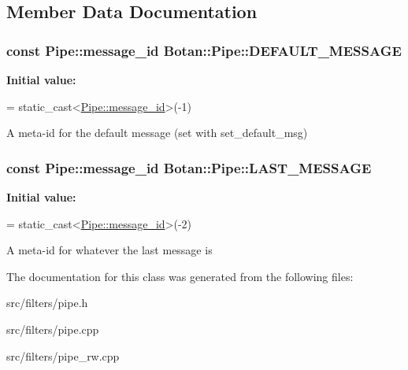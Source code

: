 \subsection{Member Data Documentation}
\hypertarget{classBotan_1_1Pipe_a75278149a3ca86f19db144049cfa2ed3}{
\subsubsection[{D\-E\-F\-A\-U\-L\-T\-\_\-\-M\-E\-S\-S\-A\-G\-E}]{\setlength{\rightskip}{0pt plus 5cm}const {\bf Pipe\-::message\-\_\-id} Botan\-::\-Pipe\-::\-D\-E\-F\-A\-U\-L\-T\-\_\-\-M\-E\-S\-S\-A\-G\-E\hspace{0.3cm}{\ttfamily [static]}}}\label{classBotan_1_1Pipe_a75278149a3ca86f19db144049cfa2ed3}
{\bfseries Initial value\-:}
\begin{DoxyCode}
=
   \textcolor{keyword}{static\_cast<}\hyperlink{classBotan_1_1Pipe_a122c19120c1c21f270b6b6225ca9883c}{Pipe::message\_id}\textcolor{keyword}{>}(-1)
\end{DoxyCode}
A meta-\/id for the default message (set with set\-\_\-default\-\_\-msg) \hypertarget{classBotan_1_1Pipe_a192a6452778feca6c4363a24b5612f46}{
\subsubsection[{L\-A\-S\-T\-\_\-\-M\-E\-S\-S\-A\-G\-E}]{\setlength{\rightskip}{0pt plus 5cm}const {\bf Pipe\-::message\-\_\-id} Botan\-::\-Pipe\-::\-L\-A\-S\-T\-\_\-\-M\-E\-S\-S\-A\-G\-E\hspace{0.3cm}{\ttfamily [static]}}}\label{classBotan_1_1Pipe_a192a6452778feca6c4363a24b5612f46}
{\bfseries Initial value\-:}
\begin{DoxyCode}
=
   \textcolor{keyword}{static\_cast<}\hyperlink{classBotan_1_1Pipe_a122c19120c1c21f270b6b6225ca9883c}{Pipe::message\_id}\textcolor{keyword}{>}(-2)
\end{DoxyCode}
A meta-\/id for whatever the last message is 

The documentation for this class was generated from the following files\-:\begin{DoxyCompactItemize}
\item 
src/filters/pipe.\-h\item 
src/filters/pipe.\-cpp\item 
src/filters/pipe\-\_\-rw.\-cpp\end{DoxyCompactItemize}

